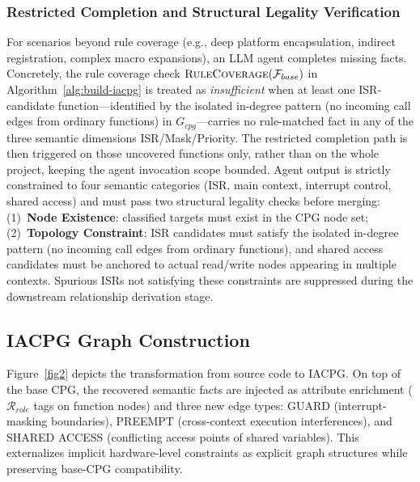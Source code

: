 \documentclass[a4paper,UKenglish,cleveref, autoref, thm-restate]{lipics-v2021}
\begin{document}
\subsubsection{Restricted Completion and Structural Legality Verification}

For scenarios beyond rule coverage (e.g., deep platform encapsulation, indirect registration, complex macro expansions), an LLM agent completes missing facts. Concretely, the rule coverage check $\Call{RuleCoverage}{\mathcal{F}_{base}}$ in Algorithm~\ref{alg:build-iacpg} is treated as \emph{insufficient} when at least one ISR-candidate function---identified by the isolated in-degree pattern (no incoming call edges from ordinary functions) in $G_{cpg}$---carries no rule-matched fact in any of the three semantic dimensions ISR/Mask/Priority. The restricted completion path is then triggered on those uncovered functions only, rather than on the whole project, keeping the agent invocation scope bounded. Agent output is strictly constrained to four semantic categories (ISR, main context, interrupt control, shared access) and must pass two structural legality checks before merging: (1)~\textbf{Node Existence}: classified targets must exist in the CPG node set; (2)~\textbf{Topology Constraint}: ISR candidates must satisfy the isolated in-degree pattern (no incoming call edges from ordinary functions), and shared access candidates must be anchored to actual read/write nodes appearing in multiple contexts. Spurious ISRs not satisfying these constraints are suppressed during the downstream relationship derivation stage.

\subsection{IACPG Graph Construction}
  
Figure~\ref{fig2} depicts the transformation from source code to IACPG. On top of the base CPG, the recovered semantic facts are injected as attribute enrichment ($\mathcal{R}_{role}$ tags on function nodes) and three new edge types: GUARD (interrupt-masking boundaries), PREEMPT (cross-context execution interferences), and SHARED ACCESS (conflicting access points of shared variables). This externalizes implicit hardware-level constraints as explicit graph structures while preserving base-CPG compatibility.
\end{document}
